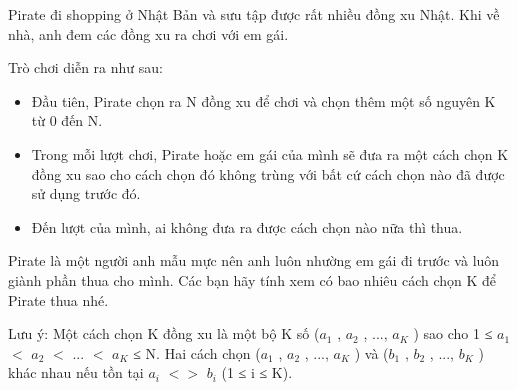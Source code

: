Pirate đi shopping ở Nhật Bản và sưu tập được rất nhiều đồng xu Nhật. Khi về nhà, anh đem các đồng xu ra chơi với em gái.  

   Trò chơi diễn ra như sau:  
\begin{itemize}
	\item     Đầu tiên, Pirate chọn ra N đồng xu để chơi và chọn thêm một số nguyên K từ 0 đến N.   
	\item     Trong mỗi lượt chơi, Pirate hoặc em gái của mình sẽ đưa ra một cách chọn K đồng xu sao cho cách chọn đó không trùng với bất cứ cách chọn nào đã được sử dụng trước đó.   
	\item     Đến lượt của mình, ai không đưa ra được cách chọn nào nữa thì thua.   
\end{itemize}

   Pirate là một người anh mẫu mực nên anh luôn nhường em gái đi trước và luôn giành phần thua cho mình. Các bạn hãy tính xem có bao nhiêu cách chọn K để Pirate thua nhé.  

   Lưu ý: Một cách chọn K đồng xu là một bộ K số ($a_{1}$   , $a_{2}$   , ..., $a_{K}$   ) sao cho 1 ≤ $a_{1}$   $<$ $a_{2}$   $<$ ... $<$ $a_{K}$   ≤ N. Hai cách chọn ($a_{1}$   , $a_{2}$   , ..., $a_{K}$   ) và ($b_{1}$   , $b_{2}$   , ..., $b_{K}$   ) khác nhau nếu tồn tại $a_{i}$   $<$$>$ $b_{i}$   (1 ≤ i ≤ K).